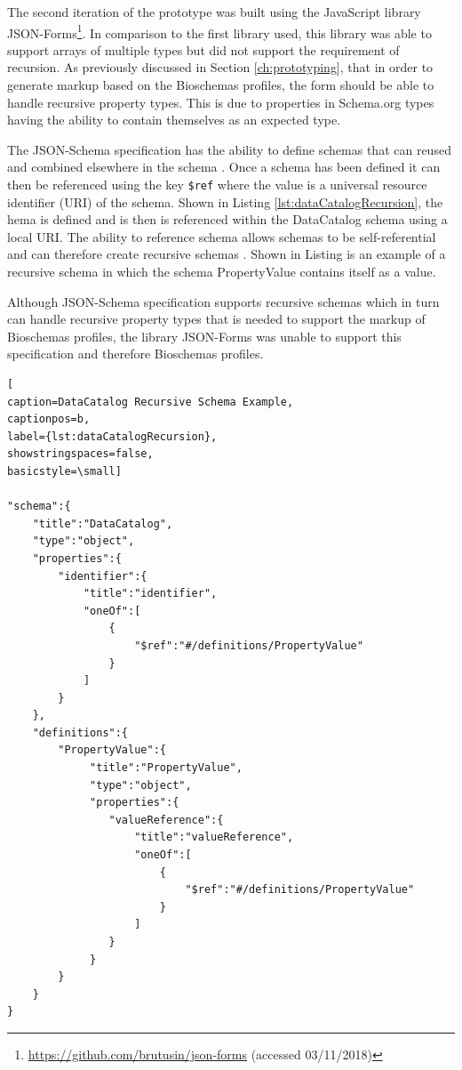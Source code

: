 \newpage
{
The second iteration of the prototype was built using the JavaScript library JSON-Forms\footnote{\url{https://github.com/brutusin/json-forms} (accessed 03/11/2018)}. In comparison to the first library used, this library was able to support arrays of multiple types but did not support the requirement of recursion. As previously discussed in Section \ref{ch:prototyping}, that in order to generate markup based on the Bioschemas profiles, the form should be able to handle recursive property types. This is due to properties in Schema.org types having the ability to contain themselves as an expected type.

The JSON-Schema specification has the ability to define schemas that can reused and combined elsewhere in the schema \cite{jsonSchemaComplex}. Once a schema has been defined it can then be referenced using the key \texttt{\$ref} where the value is a universal resource identifier (URI) of the schema. Shown in Listing \ref{lst:dataCatalogRecursion}, the hema is defined and is then is referenced within the DataCatalog schema using a local URI. The ability to reference schema allows schemas to be self-referential and can therefore create recursive schemas \cite{jsonSchemaComplex}. Shown in Listing is an example of a recursive schema in which the schema PropertyValue contains itself as a value.

Although JSON-Schema specification supports recursive schemas which in turn can handle recursive property types that is needed to support the markup of Bioschemas profiles, the library JSON-Forms was unable to support this specification and therefore Bioschemas profiles.
}


{
\begin{center}
\begin{lstlisting}[
caption=DataCatalog Recursive Schema Example,
captionpos=b,
label={lst:dataCatalogRecursion},
showstringspaces=false,
basicstyle=\small]

"schema":{
    "title":"DataCatalog",
    "type":"object",
    "properties":{
        "identifier":{
            "title":"identifier",
            "oneOf":[
                {
                    "$ref":"#/definitions/PropertyValue"
                }
            ]
        }
    },
    "definitions":{
        "PropertyValue":{
             "title":"PropertyValue",
             "type":"object",
             "properties":{
                "valueReference":{
                    "title":"valueReference",
                    "oneOf":[
                        {
                            "$ref":"#/definitions/PropertyValue"
                        }
                    ]
                }
             }
        }
    }
}

\end{lstlisting}  
\end{center}
}


